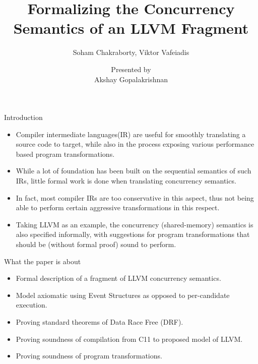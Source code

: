 \documentclass[xcolor=dvipsnames, notes]{beamer}
\title{Formalizing the Concurrency Semantics of an LLVM Fragment}
\subtitle{Soham Chakraborty, Viktor Vafeiadis}
\author{Presented by \\ Akshay Gopalakrishnan}
\begin{document}
    
    \begin{frame}

        \maketitle
    \end{frame}

    \begin{frame}{Introduction}

        \begin{itemize}
            \item Compiler intermediate languages(IR) are useful for smoothly translating a source code to target, while also in the process exposing various performance based program transformations.
            \item While a lot of foundation has been built on the sequential semantics of such IRs, little formal work is done when translating concurrency semantics.
            \item In fact, most compiler IRs are too conservative in this aspect, thus not being able to perform certain aggressive transformations in this respect.
            \item Taking LLVM as an example, the concurrency (shared-memory) semantics is also specified informally, with suggestions for program transformations that should be (without formal proof) sound to perform. 
        \end{itemize}
        
    \end{frame}

    \begin{frame}{What the paper is about}

        \begin{itemize}
            \item Formal description of a fragment of LLVM concurrency semantics.
            \item Model axiomatic using Event Structures as opposed to per-candidate execution. 
            \item Proving standard theorems of Data Race Free (DRF).
            \item Proving soundness of compilation from C11 to proposed model of LLVM.
            \item Proving soundness of program transformations.
        \end{itemize}

    \end{frame}
\end{document}
